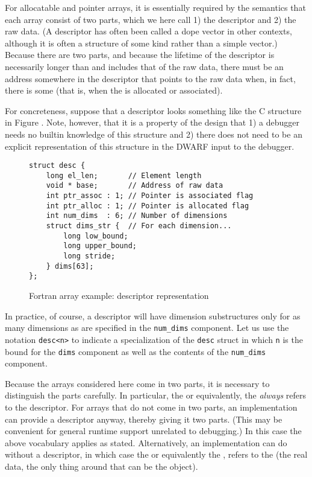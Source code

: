 For allocatable and pointer arrays, it is essentially required
by the  semantics that each array consist of 
two
parts, which we here call 1) the descriptor and 2) the raw
data. (A descriptor has often been called a dope vector in
other contexts, although it is often a structure of some kind
rather than a simple vector.) Because there are two parts,
and because the lifetime of the descriptor is necessarily
longer than and includes that of the raw data, there must be
an address somewhere in the descriptor that points to the
raw data when, in fact, there is some (that is, when 
the  is allocated or associated).

For concreteness, suppose that a descriptor looks something
like the C structure in 
Figure .
Note, however, that it is
a property of the design that 1) a debugger needs no builtin
knowledge of this structure and 2) there does not need to
be an explicit representation of this structure in the DWARF
input to the debugger.

\begin{figure}[h]
\begin{lstlisting}
struct desc {
    long el_len;       // Element length
    void * base;       // Address of raw data
    int ptr_assoc : 1; // Pointer is associated flag
    int ptr_alloc : 1; // Pointer is allocated flag
    int num_dims  : 6; // Number of dimensions
    struct dims_str {  // For each dimension...  
        long low_bound;
        long upper_bound;
        long stride;
    } dims[63];
};
\end{lstlisting}
\caption{Fortran array example: descriptor representation}
\label{fig:fortranarrayexampledescriptorrepresentation}
\end{figure}


In practice, of course, a  descriptor will have
dimension substructures only for as many dimensions as are
specified in the \texttt{num\_dims} component. Let us use the notation
\texttt{desc\textless n\textgreater}   
to indicate a specialization of the \texttt{desc} struct in
which \texttt{n} is the bound for the \texttt{dims} component as well as the
contents of the \texttt{num\_dims} component.

Because the arrays considered here come in two parts, it is
necessary to distinguish the parts carefully. In particular,
the  or equivalently, the  \emph{always} refers to the descriptor. For
arrays that do not come in two parts, an implementation can
provide a descriptor anyway, thereby giving it two parts. (This
may be convenient for general runtime support unrelated to
debugging.) In this case the above vocabulary applies as
stated. Alternatively, an implementation can do without a
descriptor, in which case the 
or equivalently the , refers
to the  (the real data, the only thing around
that can be the object).

